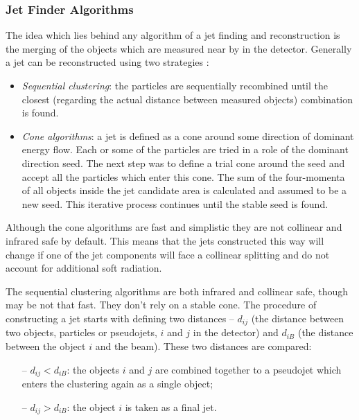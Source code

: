 \subsubsection{Jet Finder Algorithms}

The idea which lies behind any algorithm of a jet finding and reconstruction is the merging of the objects which are measured near by in the detector.
Generally a jet can be reconstructed using two strategies \cite{Salam:2007xv}:

\begin{itemize}
 \item \textit{Sequential clustering}: the particles are sequentially recombined until the closest (regarding the actual distance between measured
 objects) combination is found.
 \item \textit{Cone algorithms}: a jet is defined as a cone around some direction of dominant energy flow. Each or some of the particles are tried 
 in a role of the dominant direction seed. The next step was to define a trial cone around the seed and accept all the particles which enter this cone.
 The sum of the four-momenta of all objects inside the jet candidate area is calculated and assumed to be a new seed. This iterative process continues
 until the stable seed is found.
\end{itemize}

Although the cone algorithms are fast and simplistic they are not collinear and infrared safe by default. This means that the jets constructed this way will
change if one of the jet components will face a collinear splitting and do not account for additional soft radiation.

The sequential clustering algorithms are both infrared and collinear safe, though may be not that fast. They don't rely on a stable cone. The procedure of constructing
a jet starts with defining two distances -- $d_{ij}$ (the distance between two objects, particles or pseudojets, $i$ and $j$ in the detector) and $d_{iB}$ (the distance between the object $i$
and the beam). These two distances are compared:

\begin{itemize}
 \item [--] $d_{ij} < d_{iB}$: the objects $i$ and $j$ are combined together to a pseudojet which enters the clustering again as a single object;
 \item [--] $d_{ij} > d_{iB}$: the object $i$ is taken as a final jet.
\end{itemize}

